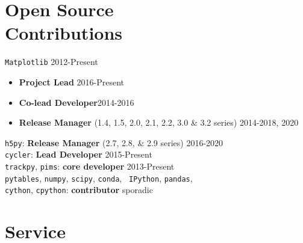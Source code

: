\documentclass[margin]{res} %
\begin{document}
\begin{resume}




\section{Open Source\\Contributions}
        {\tt Matplotlib} \hfill 2012-Present
        \begin{itemize}
  \setlength{\itemsep}{-1pt}
        \item {\bf Project Lead} \hfill 2016-Present
        \item{\bf Co-lead Developer}\hfill 2014-2016
        \item {\bf Release Manager} (1.4, 1.5, 2.0, 2.1, 2.2, 3.0 \& 3.2 series)  \hfill 2014-2018, 2020
        \end{itemize}

        {\tt h5py}: {\bf Release Manager} (2.7, 2.8, \& 2.9 series)
        \hfill 2016-2020\\
        {\tt cycler}: {\bf Lead Developer} \hfill 2015-Present\\
        {\tt trackpy}, {\tt pims}: {\bf core developer} \hfill 2013-Present \\
        {\tt pytables}, {\tt numpy}, {\tt scipy}, {\tt conda}, {\tt
          IPython}, {\tt pandas}, \\ {\tt cython}, {\tt cpython}: {\bf contributor} \hfill sporadic



\section{Service}


\end{resume}
\end{document}
